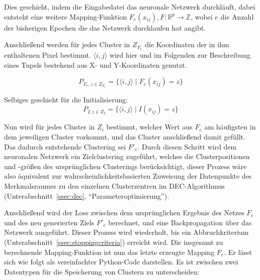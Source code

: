 
Dies geschieht, indem die Eingabedatei das neuronale Netzwerk durchläuft, dabei entsteht eine weitere Mapping-Funktion $F_e(x_{ij}), F: \mathbb{R}^p\rightarrow\mathbb{Z}$, wobei $e$ die Anzahl der bisherigen Epochen die das Netzwerk durchlaufen hat angibt.

Anschließend werden für jedes Cluster in $Z_{F_e}$  die Koordinaten der in ihm enthaltenen Pixel bestimmt. $\langle i, j\rangle$ wird hier und im Folgenden zur Beschreibung eines Tupels bestehend aus X- und Y-Koordinaten genutzt.

\begin{equation}
P_{F_e,{z\in Z_{F_e}}} = \{\langle i, j\rangle\mid F_e(x_{ij}) = z\}
\end{equation}

Selbiges geschieht für die Initialisierung:
\begin{equation}
P_{I, z\in Z_I} = \{\langle i, j\rangle\mid I(x_{ij}) = z\}
\end{equation}

Nun wird für jedes Cluster in $Z_i$ bestimmt, welcher Wert aus $F_{e}$ am häufigsten in dem jeweiligen Cluster vorkommt, und das Cluster anschließend damit gefüllt. Das dadurch entstehende Clustering sei $F'_e$. Durch diesen Schritt wird dem neuronalen Netzwerk ein Zielclustering zugeführt, welches die Clusterpositionen und -größen des ursprünglichen Clusterings berücksichtigt, dieser Prozess wäre also äquivalent zur wahrscheinlichkeitsbasierten Zuweisung der Datenpunkte des Merkmalsraumes zu den einzelnen Clusterzentren im DEC-Algorithmus (\vgl Unterabschnitt~\ref{ssec:dec}, \enquote{Parameteroptimierung}).



Anschließend wird der Loss zwischen dem ursprünglichen Ergebnis des Netzes $F_e$ und des neu generierten Ziels $F'_e$ berechnet, und eine Backpropagation über das Netzwerk ausgeführt. Dieser Prozess wird wiederholt, bis ein Abbruchkriterium (\vgl Unterabschnitt~\ref{ssec:stoppingcriteria}) erreicht wird. Die insgesamt zu berechnende Mapping-Funktion ist nun das letzte erzeugte Mapping $F_e$. Er lässt sich wie folgt als vereinfachter Python-Code darstellen. Es ist zwischen zwei Datentypen für die Speicherung von Clustern zu unterscheiden:

